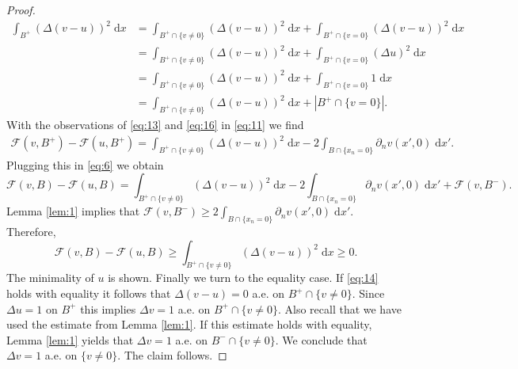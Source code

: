 \documentclass[twoside,11pt]{article}
\theoremstyle{definition}
\begin{document}
\begin{proof}
    \begin{align}
        \int_{B^+} (\Delta (v-u))^2 \; \mathrm{d}x & = \int_{B^+ \cap \{ v \neq 0 \} } (\Delta (v - u))^2 \; \mathrm{d}x + \int_{B^+ \cap \{ v =0 \} } (\Delta (v - u))^2 \; \mathrm{d}x \nonumber
       \\ &  =  \int_{B^+ \cap \{ v \neq 0 \} } (\Delta (v - u))^2 \; \mathrm{d}x  + \int_{B^+ \cap \{ v =0 \} } (\Delta u )^2 \; \mathrm{d}x \nonumber
       \\ & =  \int_{B^+ \cap \{ v \neq 0 \} } (\Delta (v - u))^2 \; \mathrm{d}x  + \int_{B^+ \cap \{ v =0 \} } 1 \; \mathrm{d}x \nonumber
       \\ &=  \int_{B^+ \cap \{ v \neq 0 \} } (\Delta (v - u))^2 \; \mathrm{d}x  + |B^+ \cap \{ v = 0 \}|.  \label{eq:16}
    \end{align}
    With the observations of \eqref{eq:13} and \eqref{eq:16} in \eqref{eq:11} we find 
    \begin{align*}
        \mathcal{F}(v,B^+) - \mathcal{F}(u,B^+) = \int_{B^+\cap \{ v \neq 0 \}} (\Delta (v-u))^2 \; \mathrm{d}x  - 2 \int_{B \cap \{x_n = 0 \}} \partial_n v(x',0) \; \mathrm{d}x'. 
    \end{align*}
    Plugging this in \eqref{eq:6} we obtain
    \begin{equation*}
        \mathcal{F}(v,B) - \mathcal{F}(u,B)= \int_{B^+\cap \{ v \neq 0 \}} (\Delta (v-u))^2 \; \mathrm{d}x  - 2 \int_{B \cap \{x_n = 0 \}} \partial_n v(x',0) \; \mathrm{d}x' + \mathcal{F}(v,B^-). 
    \end{equation*}
    Lemma \ref{lem:1} implies that $\mathcal{F}(v,B^-) \geq 2  \int_{B \cap \{x_n = 0 \}} \partial_n v(x',0) \; \mathrm{d}x' $. Therefore,
    \begin{equation}\label{eq:14}
        \mathcal{F}(v,B) - \mathcal{F}(u,B) \geq  \int_{B^+ \cap \{ v \neq 0 \} } (\Delta (v- u))^2 \; \mathrm{d}x \geq 0.
    \end{equation}
    The minimality of $u$ is shown. Finally we turn to the equality case. If \eqref{eq:14} holds with equality it follows that $\Delta (v-u) =0$ a.e. on $B^+ \cap \{ v \neq 0 \}$. Since $\Delta u = 1$ on $B^+$ this implies $\Delta v = 1$ a.e. on $B^+ \cap \{ v \neq 0 \}$. Also recall that we have used the estimate from Lemma \ref{lem:1}. If this estimate holds with equality, Lemma \ref{lem:1} yields that $\Delta v = 1$ a.e. on $B^- \cap \{ v \neq 0 \}$. We conclude that $\Delta v = 1$ a.e. on $\{ v \neq 0 \}$. The claim follows.
\end{proof}
\end{document}
